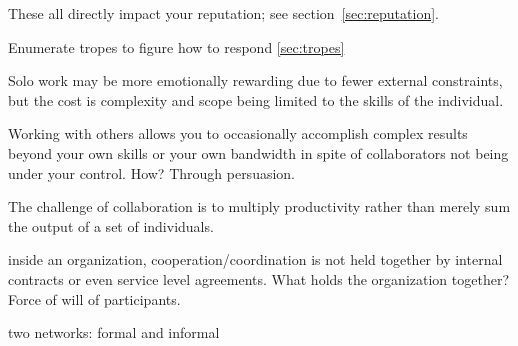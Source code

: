 These all directly impact your reputation; see section~\ref{sec:reputation}.

Enumerate tropes to figure how to respond
\ref{sec:tropes}

Solo work may be more emotionally rewarding due to fewer external constraints, but the cost is complexity and scope being limited to the skills of the individual. 

Working with others allows you to occasionally accomplish complex results beyond your own skills or your own bandwidth in spite of collaborators not being under your control. How? Through persuasion. 

The challenge of collaboration is to multiply productivity rather than merely sum the output of a set of individuals. 

inside an organization, cooperation/coordination is not held together by internal contracts or even service level agreements. What holds the organization together? Force of will of participants. 

two networks: formal and informal